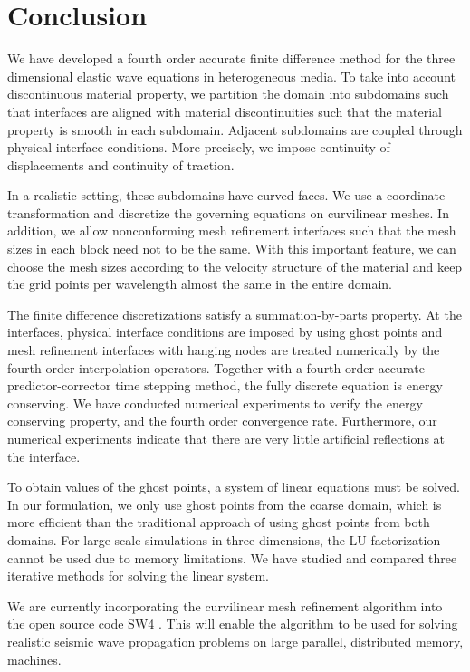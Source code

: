 \section{Conclusion}
We have developed a fourth order accurate finite difference method for the three dimensional elastic wave equations in heterogeneous media. To take into account discontinuous material property, we partition the domain into subdomains such that interfaces are aligned with material discontinuities such that the material property is smooth in each subdomain. Adjacent subdomains are coupled through physical interface conditions. More precisely, we impose continuity of displacements and continuity of traction. 

In a realistic setting, these subdomains have curved faces. We use a coordinate transformation and discretize the governing equations on curvilinear meshes. In addition, we allow nonconforming mesh refinement interfaces such that the mesh sizes in each block need not to be the same. With this important feature, we can choose the mesh sizes according to the velocity structure of the material and keep the grid points per wavelength almost the same in the entire domain. 

The finite difference discretizations satisfy a summation-by-parts property. At the interfaces, physical interface conditions are imposed by using ghost points and mesh refinement interfaces with hanging nodes are treated numerically by the fourth order interpolation operators. Together with a fourth order accurate predictor-corrector time stepping method, the fully discrete equation is energy conserving. We have conducted numerical experiments to verify the energy conserving property, and the fourth order convergence rate. Furthermore, our numerical experiments indicate that there are very little artificial reflections at the interface.

To obtain values of the ghost points, a system of linear equations must be solved. In our formulation, we only use ghost points from the coarse domain, which is more efficient than the traditional approach of using ghost points from both domains.  For large-scale simulations in three dimensions, the LU factorization cannot be used due to memory limitations. We have studied and compared three iterative methods for solving the linear system.

We are currently incorporating the curvilinear mesh refinement algorithm into the open source code SW4 \cite{SW4}. This will enable the algorithm to be used for solving realistic seismic wave propagation problems on large parallel, distributed memory, machines.